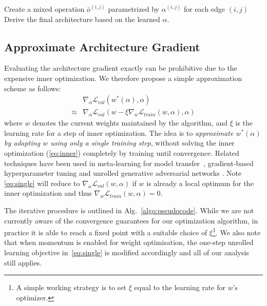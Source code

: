 \documentclass{article}
\begin{document}
\begin{algorithm}[t]
\DontPrintSemicolon
Create a mixed operation $\bar{o}^{(i,j)}$ parametrized by $\alpha^{(i,j)}$ for each edge $(i,j)$\;
Derive the final architecture based on the learned $\alpha$.
\caption{{\sc DARTS} -- Differentiable Architecture Search}
\label{algo:pseudocode}
\end{algorithm}

\subsection{Approximate Architecture Gradient}
\label{sec:sec:approximation}
Evaluating the architecture gradient exactly can be prohibitive due to the expensive inner optimization.
We therefore propose a simple approximation scheme as follows:
\begin{align}
&\nabla_\alpha \mathcal{L}_{val}(w^*(\alpha), \alpha) \\
\approx &\nabla_\alpha \mathcal{L}_{val}(w - \xi \nabla_{w} \mathcal{L}_{train}(w, \alpha), \alpha) \label{eq:single}
\end{align}
where $w$ denotes the current weights maintained by the algorithm,
and $\xi$ is the learning rate for a step of inner optimization.
The idea is to \emph{approximate $w^*(\alpha)$
by adapting $w$ using only a single training step}, without solving the inner optimization (\eqref{eq:inner}) completely by training until convergence.
Related techniques have been used in meta-learning for model transfer~\citep{finn2017model}, gradient-based hyperparameter tuning \citep{luketina2016scalable} and unrolled generative adversarial networks \citep{metz2016unrolled}.
Note \eqref{eq:single} will reduce to $\nabla_\alpha \mathcal{L}_{val}(w, \alpha)$ if $w$ is already a local optimum for the inner optimization and thus $\nabla_w \mathcal{L}_{train}(w, \alpha) = 0$.

The iterative procedure is outlined in Alg.~\ref{algo:pseudocode}.
While we are not currently aware of the convergence guarantees for our optimization algorithm, in practice it is able to reach a fixed point with a suitable choice of $\xi$\footnote{A simple working strategy is to set $\xi$ equal to the learning rate for $w$'s optimizer.}.
We also note that
when momentum is enabled for weight optimisation,
the one-step unrolled learning objective in~\eqref{eq:single} is modified accordingly and all of our analysis still applies.
\end{document}
